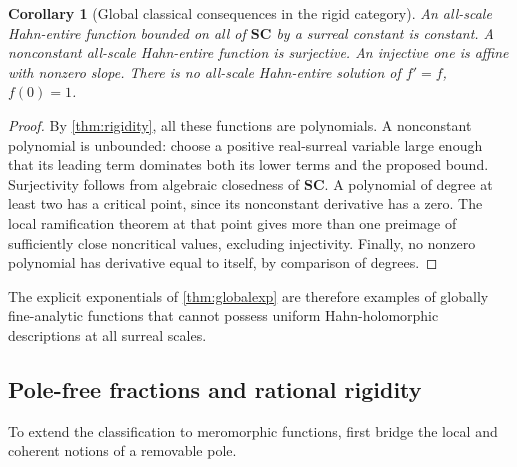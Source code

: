 \documentclass[11pt,letterpaper]{article}
\newtheorem{corollary}[theorem]{Corollary}
\theoremstyle{definition}
\theoremstyle{remark}
\newcommand{\SC}{\mathbf{SC}}
\numberwithin{equation}{section}
\begin{document}
\begin{corollary}[Global classical consequences in the rigid category]\label{cor:globalclassical}
An all-scale Hahn-entire function bounded on all of $\SC$ by a surreal constant is constant. A nonconstant all-scale Hahn-entire function is surjective. An injective one is affine with nonzero slope. There is no all-scale Hahn-entire solution of $f'=f$, $f(0)=1$.
\end{corollary}
\begin{proof}
By \cref{thm:rigidity}, all these functions are polynomials. A nonconstant polynomial is unbounded: choose a positive real-surreal variable large enough that its leading term dominates both its lower terms and the proposed bound. Surjectivity follows from algebraic closedness of $\SC$. A polynomial of degree at least two has a critical point, since its nonconstant derivative has a zero. The local ramification theorem at that point gives more than one preimage of sufficiently close noncritical values, excluding injectivity. Finally, no nonzero polynomial has derivative equal to itself, by comparison of degrees.
\end{proof}
The explicit exponentials of \cref{thm:globalexp} are therefore examples of globally fine-analytic functions that cannot possess uniform Hahn-holomorphic descriptions at all surreal scales.

\subsection{Pole-free fractions and rational rigidity}
To extend the classification to meromorphic functions, first bridge the local and coherent notions of a removable pole.
\end{document}
